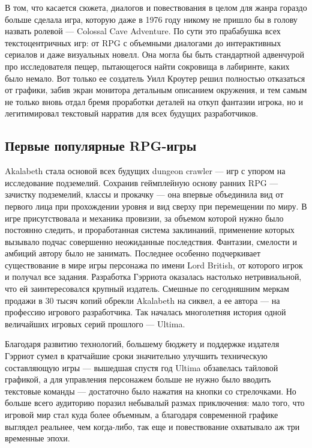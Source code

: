 В том, что касается сюжета, диалогов и повествования в целом для  жанра гораздо больше сделала игра, которую даже в 1976 году никому не пришло бы в голову назвать ролевой — Colossal Cave Adventure. По сути это прабабушка всех текстоцентричных игр: от RPG с объемными диалогами до интерактивных сериалов и даже визуальных новелл. Она могла бы быть стандартной адвенчурой про исследователя пещер, пытающегося найти сокровища в лабиринте, каких было немало. Вот только ее создатель Уилл Кроутер решил полностью отказаться от графики, забив экран монитора детальным описанием окружения, и тем самым не только вновь отдал бремя проработки деталей на откуп фантазии игрока, но и легитимировал текстовый нарратив для всех будущих разработчиков. 

\subsection{Первые популярные RPG-игры}
Akalabeth стала основой всех будущих dungeon crawler — игр с упором на исследование подземелий. Сохранив геймплейную основу ранних RPG — зачистку подземелий, классы и прокачку — она впервые объединила вид от первого лица при прохождении уровня и вид сверху при перемещении по миру. В игре присутствовала и механика провизии, за объемом которой нужно было постоянно следить, и проработанная система заклинаний, применение которых вызывало подчас совершенно неожиданные последствия. Фантазии, смелости и амбиций автору было не занимать. Последнее особенно подчеркивает существование в мире игры персонажа по имени Lord British, от которого игрок и получал все задания. Разработка Гэрриота оказалась настолько нетривиальной, что ей заинтересовался крупный издатель. Смешные по сегодняшним меркам продажи в 30 тысяч копий обрекли Akalabeth  на сиквел, а ее автора — на профессию игрового разработчика. Так началась многолетняя история одной величайших игровых серий прошлого — Ultima.

Благодаря развитию технологий, большему бюджету и поддержке издателя Гэрриот сумел в кратчайшие сроки значительно улучшить техническую составляющую игры — вышедшая спустя год Ultima обзавелась тайловой графикой, а для управления персонажем больше не нужно было вводить текстовые команды — достаточно было нажатия на кнопки со стрелочками. Но больше всего аудиторию поразил небывалый размах приключения: мало того, что игровой мир стал куда более объемным, а благодаря современной графике выглядел реальнее, чем когда-либо, так еще и повествование охватывало аж три временные эпохи.


